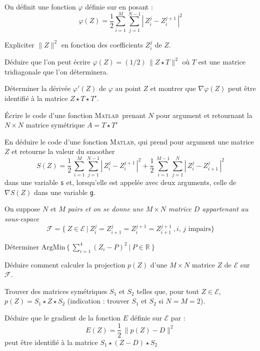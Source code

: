 \documentclass[12pt,a4paper,fleqn]{report}
\newcommand{\matlab}{\textsc{Matlab}}
\newcommand{\R}{\mathbb R}
\newcommand{\grad}{\nabla}
\newcommand{\on}{\begin{displaymath}}
\newcommand{\off}{\end{displaymath}}
\begin{document}
\begin{exercice}
On d\'efinit une fonction $\varphi$ d\'efinie sur en posant :
\on \varphi(Z)=\frac{1}{2} \sum_{i=1}^M \sum_{j=1}^{N-1} \left| \, Z_i^j -Z_i^{j+1}\,\right|^2 \off
\begin{questions}
\item Expliciter $\|Z\|^2$ en fonction des coefficients $Z_i^j$ de $Z$.
\item D\'eduire que l'on peut \'ecrire $\varphi(Z)=(1/2)\, \|Z\star T\|^2$ o\`u $T$ est une matrice tridiagonale que l'on d\'eterminera.
\item D\'eterminer la d\'eriv\'ee $\varphi'(Z)$ de $\varphi$ au point $Z$ et montrer que $\grad \varphi(Z)$ peut être identifi\'e \`a la matrice $Z\star T \star T'$. 
\item \'Ecrire le code d'une fonction \matlab\ prenant $N$ pour argument et retournant la $N\times N$ matrice sym\'etrique $A=T\star T'$ 
\item En d\'eduire le code d'une fonction \matlab, qui prend pour argument une matrice $Z$ et retourne la valeur du smoother 
\on S(Z) = \frac{1}{2}\, \sum_{i=1}^M \sum_{j=1}^{N-1} \left| \, Z_i^j -Z_i^{j+1}\,\right|^2 +
\frac{1}{2}\,\sum_{i=1}^{M-1} \sum_{j=1}^N \left| \, Z_i^j -Z_{i+1}^j \,\right|^2 \off
dans une variable \texttt{s} et, lorsqu'elle est appel\'ee avec deux arguments, celle de $\grad S(Z)$ dans une variable \texttt{g}.
\end{questions}
\end{exercice}

\begin{exercice}
On suppose $N$ et $M$ \it pairs \rm et on se donne une $M\times N$ matrice $D$ appartenant au sous-espace
\on \mathcal F= \{\ Z\in \mathcal E\ | \ Z_i^j=Z_{i+1}^j=Z_i^{j+1}=Z_{i+1}^{j+1}\ ,\mbox{$i$, $j$ impairs}\} \off
\begin{questions}
\item D\'eterminer $\mathrm{ArgMin}\,\{ \ \sum_{i=1}^4 (Z_i-P)^2 \ | \ P \in \R \ \}$
\item D\'eduire comment calculer la projection $p(Z)$ d'une $M\times N$ matrice $Z$ de $\mathcal E$ sur $\mathcal F$.
\item Trouver des matrices sym\'etriques $S_1$ et $S_2$ telles que, pour tout $Z\in\mathcal E$, $p(Z)=S_1\star Z\star S_2$ (indication : trouver $S_1$ et $S_2$ si $N=M=2$).
\item D\'eduire que le gradient de la fonction $E$ d\'efinie sur $\mathcal E$ par : 
\on E(Z)= \frac{1}{2}\,\| p(Z)-D\|^2 \off
peut être identifi\'e \`a la matrice $S_1\star (Z-D)\star S_2$
\end{questions}
\end{exercice}
\end{document}

